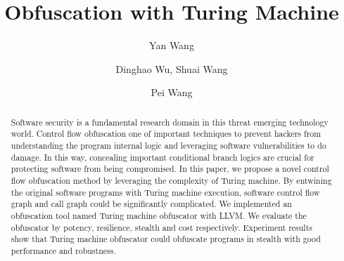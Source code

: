 \documentclass[lnicst]{svmultln}
\begin{document}
%
\mainmatter              %
%
\title{Obfuscation with Turing Machine}
%
%
\author{Yan Wang \and Dinghao Wu,
Shuai Wang \and Pei Wang}
%
%
%
\institute{Pennsylvania State University, State College,PA 16801, USA,\\
\email{ybw5084@ist.psu.edu} %
}
\maketitle              

\begin{abstract}        %
Software security is a fundamental research domain in this threat emerging technology world. Control flow obfuscation one of important techniques to prevent hackers from understanding the program internal logic and leveraging software vulnerabilities to do damage. In this way, concealing important conditional branch logics are crucial for protecting software from being compromised. In this paper, we propose a novel control flow obfuscation method by leveraging the complexity of Turing machine. By entwining the original software programs with Turing machine execution, software control flow graph and call graph could be significantly complicated. We implemented an obfuscation tool named Turing machine obfuscator with LLVM. We evaluate the obfuscator by potency, resilience, stealth and cost respectively. Experiment results show that Turing machine obfuscator could obfuscate programs in stealth with good performance and robustness. 
\end{abstract}
%
\end{document}
